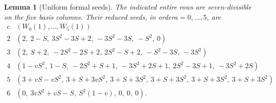 \documentclass[11pt]{article}
\newtheorem{lemma}{Lemma}\newtheorem{theorem}[lemma]{Theorem}
\begin{document}
\begin{lemma}[Uniform formal seeds]\label{lem:seeds}
The indicated entire rows are seven-divisible on the five basis
columns. Their reduced seeds, in order$a=0,\ldots,5$, are
\begingroup\footnotesize\setlength{\arraycolsep}{3pt}
\[
\begin{array}{c|l}
c&(W_0(1),\ldots,W_5(1))\\\hline
2&(2,\ 2-S,\ 3S^2-3S+2,\ -3S^2-3S,\ -S^2,\ 0)\\
3&(2,\ S+2,\ -2S^2-2S+2,\ 2S^2-S+2,\ -S^2-3S,\ -3S^2)\\
4&(1-vS^2,\ 1-S,\ -2S^2+S+1,\ -3S^2+2S+1,\
     2S^2-3S+1,\ -3S^2+2S)\\
5&(3+vS-vS^2,\ 3+S+3vS^2,\
                 3+S+3S^2,\ 3+S+3S^2,\ 3+S+3S^2,\ 3+S+3S^2)\\
6&(0,\ 3vS^2+vS-S,\ S^2(1-v),\ 0,\ 0,\ 0).
\end{array}                                                    \tag{2}
\]
\endgroup
\end{lemma}
\end{document}
